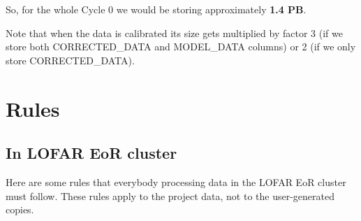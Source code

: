 \documentclass[a4paper,11pt]{article}
\begin{document}
\vspace{10pt}

So, for the whole Cycle 0 we would be storing approximately \textbf{1.4 PB}.

Note that when the data is calibrated its size gets multiplied by factor 3 (if we store both CORRECTED\_DATA and MODEL\_DATA columns) or 2 (if we only store CORRECTED\_DATA).

\newpage

\section {Rules}
\label{sec:rules}

\subsection{In LOFAR EoR cluster}

Here are some rules that everybody processing data in the LOFAR EoR cluster must follow. These rules apply to the project data, not to the user-generated copies.
\end{document}
